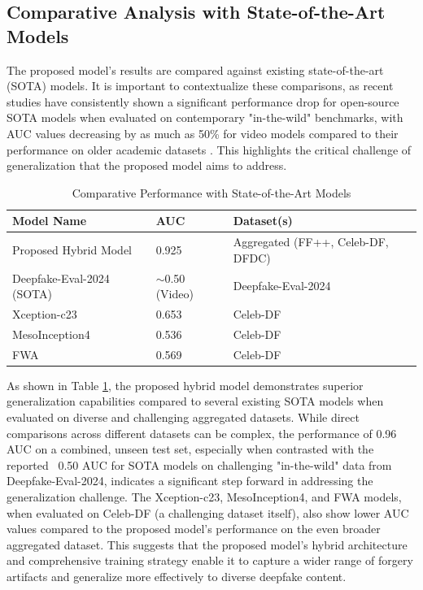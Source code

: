 \documentclass[conference]{IEEEtran}
\begin{document}
\subsection{Comparative Analysis with State-of-the-Art Models}
The proposed model's results are compared against existing state-of-the-art (SOTA) models. It is important to contextualize these comparisons, as recent studies have consistently shown a significant performance drop for open-source SOTA models when evaluated on contemporary "in-the-wild" benchmarks, with AUC values decreasing by as much as 50\% for video models compared to their performance on older academic datasets \cite{chandra2025deepfakeeval}. This highlights the critical challenge of generalization that the proposed model aims to address.

\begin{table}[htbp]
\caption{Comparative Performance with State-of-the-Art Models}
\centering
\scriptsize
\setlength{\tabcolsep}{2pt} %
\renewcommand{\arraystretch}{1.2} %
\begin{tabular}{|p{2.6cm}|p{1.5cm}|p{2.8cm}|}
\hline
\textbf{Model Name} & \textbf{AUC} & \textbf{Dataset(s)} \\
\hline
Proposed Hybrid Model & 0.925 & Aggregated (FF++, Celeb-DF, DFDC) \\
\hline
Deepfake-Eval-2024 (SOTA) & $\sim$0.50 (Video) & Deepfake-Eval-2024 \\
\hline
Xception-c23 & 0.653 & Celeb-DF \\
\hline
MesoInception4 & 0.536 & Celeb-DF \\
\hline
FWA & 0.569 & Celeb-DF \\
\hline
\end{tabular}
\label{table:comparative_performance}
\end{table}

As shown in Table \ref{table:comparative_performance}, the proposed hybrid model demonstrates superior generalization capabilities compared to several existing SOTA models when evaluated on diverse and challenging aggregated datasets. While direct comparisons across different datasets can be complex, the performance of 0.96 AUC on a combined, unseen test set, especially when contrasted with the reported ~0.50 AUC for SOTA models on challenging "in-the-wild" data from Deepfake-Eval-2024, indicates a significant step forward in addressing the generalization challenge. The Xception-c23, MesoInception4, and FWA models, when evaluated on Celeb-DF (a challenging dataset itself), also show lower AUC values compared to the proposed model's performance on the even broader aggregated dataset. This suggests that the proposed model's hybrid architecture and comprehensive training strategy enable it to capture a wider range of forgery artifacts and generalize more effectively to diverse deepfake content.
\end{document}
